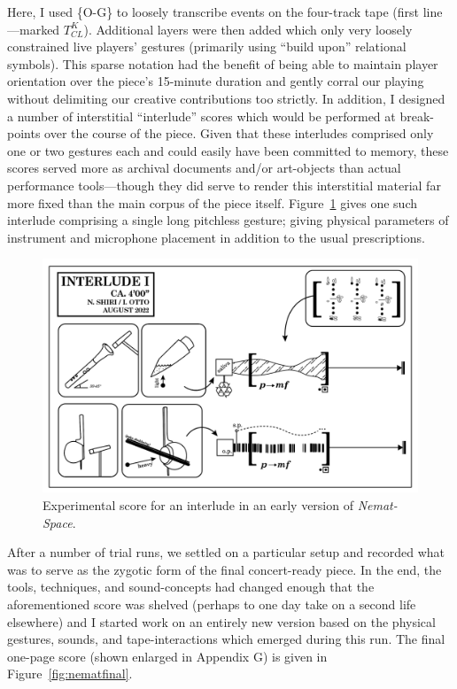     Here, I used \{O-G\} to loosely transcribe events on the four-track tape (first line---marked $T^{K}_{CL}$). Additional layers were then added which only very loosely constrained live players' gestures (primarily using ``build upon'' relational symbols). This sparse notation had the benefit of being able to maintain player orientation over the piece's 15-minute duration and gently corral our playing without delimiting our creative contributions too strictly. In addition, I designed a number of interstitial ``interlude'' scores which would be performed at break-points over the course of the piece. Given that these interludes comprised only one or two gestures each and could easily have been committed to memory, these scores served more as archival documents and/or art-objects than actual performance tools---though they did serve to render this interstitial material far more fixed than the main corpus of the piece itself. Figure~\ref{fig:experimentalinterlude} gives one such interlude comprising a single long pitchless gesture; giving physical parameters of instrument and microphone placement in addition to the usual prescriptions.
    
        \begin{figure}
            \centering
            \includegraphics[width=.8\textwidth]{images/chapter4/nemat-interlude.png}
            \captionsetup{width=.5\textwidth}
            \caption{Experimental score for an interlude in an early version of \textit{Nemat-Space}.}
            \label{fig:experimentalinterlude}
        \end{figure}

    After a number of trial runs, we settled on a particular setup and recorded what was to serve as the zygotic form of the final concert-ready piece. In the end, the tools, techniques, and sound-concepts had changed enough that the aforementioned score was shelved (perhaps to one day take on a second life elsewhere) and I started work on an entirely new version based on the physical gestures, sounds, and tape-interactions which emerged during this run. The final one-page score (shown enlarged in Appendix G) is given in Figure~\ref{fig:nematfinal}.

